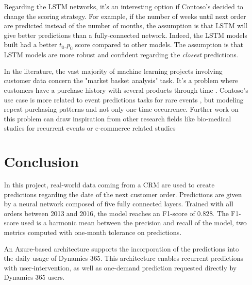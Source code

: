 Regarding the LSTM networks, it's an interesting option if Contoso's decided to change the scoring strategy. For example, if the number of weeks until next order are predicted instead of the number of months, the assumption is that LSTM will give better predictions than a fully-connected network. Indeed, the LSTM models built had a better $t_0\_p_0$ score compared to other models. The assumption is that LSTM models are more robust and confident regarding the \textit{closest} predictions.

In the literature, the vast majority of machine learning projects involving customer data concern the "market basket analysis" task. It's a problem where customers have a purchase history with several products through time \cite{temporal-feature}. Contoso's use case is more related to event predictions tasks for rare events \cite{7953302, Malhotra2015LongST}, but modeling repeat purchasing patterns and not only one-time occurrence. Further work on this problem can draw inspiration from other research fields like bio-medical studies for recurrent events \cite{biomedical-recurrent-events} or e-commerce related studies \cite{Liu:2016-repeat-buyer, Tian2015}

\section{Conclusion} \label{sec:use-case-conclusion}
In this project, real-world data coming from a CRM are used to create predictions regarding the date of the next customer order. Predictions are given by a neural network composed of five fully connected layers. Trained with all orders between 2013 and 2016, the model reaches an F1-score of 0.828. The F1-score used is a harmonic mean between the precision and recall of the model, two metrics computed with one-month tolerance on predictions.

An Azure-based architecture supports the incorporation of the predictions into the daily usage of Dynamics 365. This architecture enables recurrent predictions with user-intervention, as well as one-demand prediction requested directly by Dynamics 365 users.